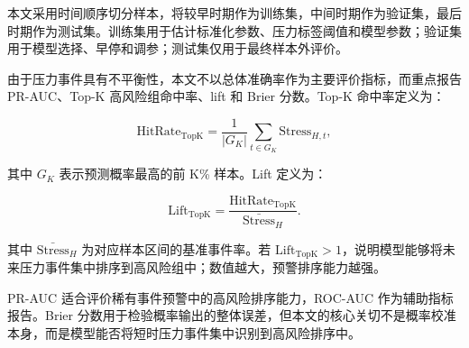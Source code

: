本文采用时间顺序切分样本，将较早时期作为训练集，中间时期作为验证集，最后时期作为测试集。训练集用于估计标准化参数、压力标签阈值和模型参数；验证集用于模型选择、早停和调参；测试集仅用于最终样本外评价。

由于压力事件具有不平衡性，本文不以总体准确率作为主要评价指标，而重点报告 PR-AUC、Top-K 高风险组命中率、lift 和 Brier 分数。Top-K 命中率定义为：

\begin{equation}
\mathrm{HitRate}_{\mathrm{TopK}}
=
\frac{1}{|G_K|}
\sum_{t\in G_K} \mathrm{Stress}_{H,t},
\end{equation}

其中 $G_K$ 表示预测概率最高的前 K\% 样本。Lift 定义为：

\begin{equation}
\mathrm{Lift}_{\mathrm{TopK}}
=
\frac{\mathrm{HitRate}_{\mathrm{TopK}}}
{\bar{\mathrm{Stress}}_H}.
\end{equation}

其中 $\bar{\mathrm{Stress}}_H$ 为对应样本区间的基准事件率。若 $\mathrm{Lift}_{\mathrm{TopK}}>1$，说明模型能够将未来压力事件集中排序到高风险组中；数值越大，预警排序能力越强。

PR-AUC 适合评价稀有事件预警中的高风险排序能力，ROC-AUC 作为辅助指标报告。Brier 分数用于检验概率输出的整体误差，但本文的核心关切不是概率校准本身，而是模型能否将短时压力事件集中识别到高风险排序中。

\FloatBarrier
